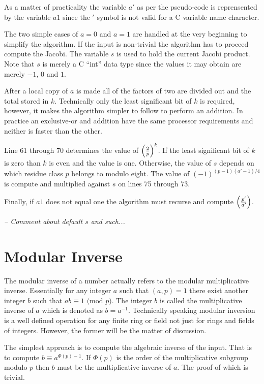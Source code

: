\documentclass[b5paper]{book}
\begin{document}
As a matter of practicality the variable $a'$ as per the pseudo-code is reprensented by the variable $a1$ since the $'$ symbol is not valid for a C 
variable name character. 

The two simple cases of $a = 0$ and $a = 1$ are handled at the very beginning to simplify the algorithm.  If the input is non-trivial the algorithm
has to proceed compute the Jacobi.  The variable $s$ is used to hold the current Jacobi product.  Note that $s$ is merely a C ``int'' data type since
the values it may obtain are merely $-1$, $0$ and $1$.  

After a local copy of $a$ is made all of the factors of two are divided out and the total stored in $k$.  Technically only the least significant
bit of $k$ is required, however, it makes the algorithm simpler to follow to perform an addition. In practice an exclusive-or and addition have the same 
processor requirements and neither is faster than the other.

Line 61 through 70 determines the value of $\left ( { 2 \over p } \right )^k$.  If the least significant bit of $k$ is zero than
$k$ is even and the value is one.  Otherwise, the value of $s$ depends on which residue class $p$ belongs to modulo eight.  The value of
$(-1)^{(p-1)(a'-1)/4}$ is compute and multiplied against $s$ on lines 75 through 73.  

Finally, if $a1$ does not equal one the algorithm must recurse and compute $\left ( {p' \over a'} \right )$.  

\textit{-- Comment about default $s$ and such...}

\section{Modular Inverse}
\label{sec:modinv}
The modular inverse of a number actually refers to the modular multiplicative inverse.  Essentially for any integer $a$ such that $(a, p) = 1$ there
exist another integer $b$ such that $ab \equiv 1 \mbox{ (mod }p\mbox{)}$.  The integer $b$ is called the multiplicative inverse of $a$ which is
denoted as $b = a^{-1}$.  Technically speaking modular inversion is a well defined operation for any finite ring or field not just for rings and 
fields of integers.  However, the former will be the matter of discussion.

The simplest approach is to compute the algebraic inverse of the input.  That is to compute $b \equiv a^{\Phi(p) - 1}$.  If $\Phi(p)$ is the 
order of the multiplicative subgroup modulo $p$ then $b$ must be the multiplicative inverse of $a$.  The proof of which is trivial.
\end{document}
